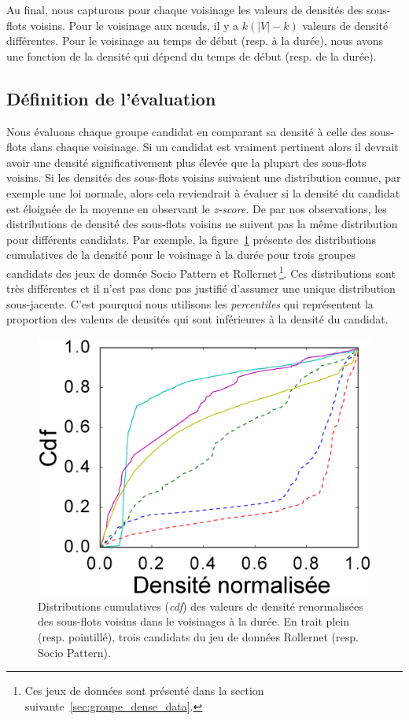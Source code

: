 Au final, nous capturons pour chaque voisinage les valeurs de densités des sous-flots voisins.
Pour le voisinage aux n\oe{}uds, il y a $k(|V|-k)$ valeurs de densité différentes.
Pour le voisinage au temps de début (resp. à la durée), nous avons une fonction de la densité qui dépend du temps de début (resp. de la durée).


\subsection{Définition de l'évaluation}
Nous évaluons chaque groupe candidat en comparant sa densité à celle des sous-flots dans chaque voisinage.
Si un candidat est vraiment pertinent alors il devrait avoir une densité significativement plus élevée que la plupart des sous-flots voisins.
Si les densités des sous-flots voisins suivaient une distribution connue, par exemple une loi normale, alors cela reviendrait à évaluer si la densité du candidat est éloignée de la moyenne en observant le \emph{z-score}.
De par nos observations, les distributions de densité des sous-flots voisins ne suivent pas la même distribution pour différents candidats.
Par exemple, la figure~\ref{fig:distrib_dens} présente des distributions cumulatives de la densité pour le voisinage à la durée pour trois groupes candidats des jeux de donnée Socio Pattern et Rollernet\,\footnote{Ces jeux de données sont présenté dans la section suivante~\ref{sec:groupe_dense_data}.}.
Ces distributions sont très différentes et il n'est pas donc pas justifié d'assumer une unique distribution sous-jacente.
C'est pourquoi nous utilisons les \emph{percentiles} qui représentent la proportion des valeurs de densités qui sont inférieures à la densité du candidat.


\begin{figure}
\centering
\includegraphics[width=0.3\linewidth]{img/GroupeDense/cdf_density_duration.eps}
\caption{Distributions cumulatives (\emph{cdf}) des valeurs de densité renormalisées des sous-flots voisins dans le voisinages à la durée.
En trait plein (resp. pointillé), trois candidats du jeu de données Rollernet (resp. Socio Pattern).}
\label{fig:distrib_dens}
\end{figure}

